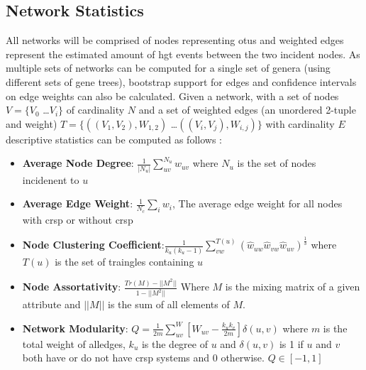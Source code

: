 \subsection{Network Statistics}
All networks will be comprised of nodes representing \ac{otu}s and weighted edges represent the estimated amount of \ac{hgt} events between the two incident nodes.
As multiple sets of networks can be computed for a single set of genera (using different sets of gene trees), bootstrap support for edges and confidence intervals on edge weights can also be calculated.
Given a network, with a set of nodes $V = \{V_0$ \dots $V_i\}$ of cardinality $N$ and a set of weighted edges (an unordered 2-tuple and weight) $T = \{((V_1,V_2),W_{1,2})$ \dots $((V_i,V_j),W_{i,j})\}$ with cardinality $E$ descriptive statistics can be computed as follows \citep{netstat}:
    \begin{itemize}
        \item \textbf{Average Node Degree}: $\frac{1}{|N_u|}\sum_{uv}^{N_u} w_{uv}$ where $N_u$ is the set of nodes incidenent to $u$
        \item \textbf{Average Edge Weight}: $\frac{1}{N_c}\sum_i w_i$, The average edge weight for all nodes with \ac{crsp} or without \ac{crsp}
        \item \textbf{Node Clustering Coefficient}:$\frac{1}{k_u(k_u-1)} \sum_{vw}^{T(u)} (\hat{w}_{uw} \hat{w}_{vw} \hat{w}_{uv})^{\frac{1}{3}}$ where $T(u)$ is the set of traingles containing $u$ \autocite{clustering}
        \item \textbf{Node Assortativity}: $\frac{Tr(M)-||M^2||}{1-||M^2||}$ Where $M$ is the mixing matrix of a given attribute and $||M||$ is the sum of all elements of $M$.\autocite{newmanmix}
        \item \textbf{Network Modularity}: $Q=\frac{1}{2m}\sum_{uv}^W [W_{uv} - \frac{k_u k_v}{2m}]\delta(u,v)$ where $m$ is the total weight of alledges, $k_u$ is the degree of $u$ and $\delta(u,v)$ is 1 if $u$ and $v$ both have or do not have \ac{crsp} systems and 0 otherwise. $Q \in [-1,1]$ \autocite{modularity}
    \end{itemize}
